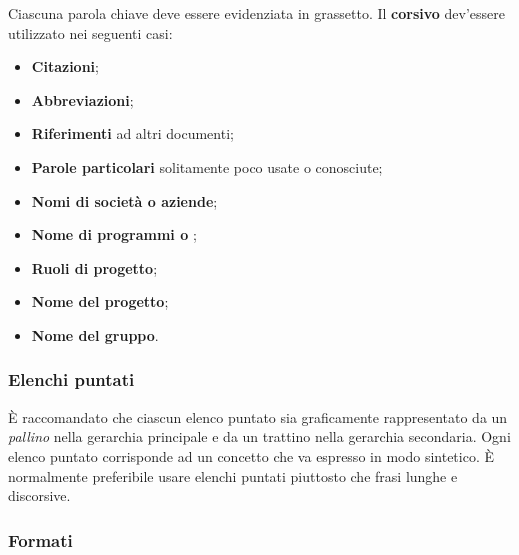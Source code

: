 	Ciascuna parola chiave deve essere evidenziata in grassetto. Il \textbf{corsivo} dev'essere utilizzato nei seguenti casi:
	\begin{itemize}
	
		\item \textbf{Citazioni};
		\item \textbf{Abbreviazioni};
		\item \textbf{Riferimenti} ad altri documenti;
		\item \textbf{Parole particolari} solitamente poco usate o conosciute;
		\item \textbf{Nomi di società o aziende};
		\item \textbf{Nome di programmi o };
		\item \textbf{Ruoli di progetto};
		\item \textbf{Nome del progetto};
		\item \textbf{Nome del gruppo}.
	\end{itemize}		
	
	\subsubsection{Elenchi puntati}
	
	È raccomandato che ciascun elenco puntato sia graficamente rappresentato da un \textit{pallino} nella gerarchia principale e da un trattino nella gerarchia secondaria. Ogni elenco puntato corrisponde ad un concetto che va espresso in modo sintetico. È normalmente preferibile usare elenchi puntati piuttosto che frasi lunghe e discorsive.
	
	\subsubsection{Formati}
	
